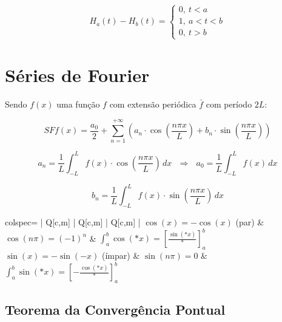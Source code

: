 \documentclass[11pt, a4paper]{article}
\begin{document}
\begin{equation*}
    H_a(t) - H_b(t) = 
    \begin{cases}
        0, \ t < a \\
        1, \ a < t < b \\
        0, \ t > b
    \end{cases}
\end{equation*}

\newpage

\section{Séries de Fourier}

Sendo $f(x)$ uma função $f$ com extensão periódica $\bar{f}$ com período $2L$:

\begin{equation*}
    SFf(x) = \frac{a_0}{2} + \sum_{n=1}^{+\infty}
    \left(
    a_n \cdot \cos\left(\frac{n\pi x}{L}\right) +
    b_n \cdot \sin\left(\frac{n\pi x}{L}\right)
    \right)
\end{equation*}

\begin{equation*}
    a_n =
    \frac{1}{L} \int_{-L}^{L} f(x) \cdot \cos\left(\frac{n\pi x}{L}\right) \, dx
    \ \ \ \Rightarrow \ \ \
    a_0 =
    \frac{1}{L} \int_{-L}^{L} f(x) \, dx
\end{equation*}

\begin{equation*}
    b_n =
    \frac{1}{L} \int_{-L}^{L} f(x) \cdot \sin\left(\frac{n\pi x}{L}\right) \, dx
\end{equation*}

\begin{center}
    \begin{tblr}[T]{colspec={ | Q[c,m] | Q[c,m] | Q[c,m] | }}
        \hline
        $\cos(x) = - \cos(x)$ (par)    &
        $\cos(n\pi) = (-1)^n$          &
        $\displaystyle \int_a^b \cos(*x) = \left[\frac{\sin(*x)}{*}\right]_a^b$ \\\hline
        $\sin(x) = - \sin(-x)$ (ímpar) &
        $\sin(n\pi) = 0$               &
        $\displaystyle \int_a^b \sin(*x) = \left[-\frac{\cos(*x)}{*}\right]_a^b$
        \\\hline
    \end{tblr}
\end{center}

\subsection{Teorema da Convergência Pontual}
\end{document}
